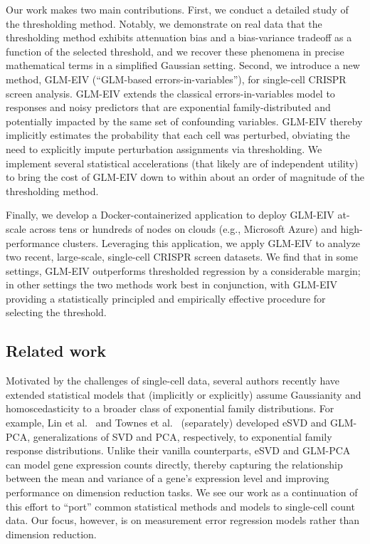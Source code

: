 \documentclass[12pt]{article}
\begin{document}
Our work makes two main contributions. First, we conduct a detailed study of the thresholding method. Notably, we demonstrate on real data that the thresholding method exhibits attenuation bias and a bias-variance tradeoff as a function of the selected threshold, and we recover these phenomena in precise mathematical terms in a simplified Gaussian setting. Second, we introduce a new method, GLM-EIV (``GLM-based errors-in-variables''), for single-cell CRISPR screen analysis. GLM-EIV extends the classical errors-in-variables model \parencite{carroll} to responses and noisy predictors that are exponential family-distributed and potentially impacted by the same set of confounding variables. GLM-EIV thereby implicitly estimates the probability that each cell was perturbed, obviating the need to explicitly impute perturbation assignments via thresholding. We implement several statistical accelerations (that likely are of independent utility) to bring the cost of GLM-EIV down to within about an order of magnitude of the thresholding method.

Finally, we develop a Docker-containerized application to deploy GLM-EIV at-scale across tens or hundreds of nodes on clouds (e.g., Microsoft Azure) and high-performance clusters. Leveraging this application, we apply GLM-EIV to analyze two recent, large-scale, single-cell CRISPR screen datasets. We find that in some settings, GLM-EIV outperforms thresholded regression by a considerable margin; in other settings the two methods work best in conjunction, with GLM-EIV providing a statistically principled and empirically effective procedure for selecting the threshold.

\iffalse
\subsection{Related work}
Motivated by the challenges of single-cell data, several authors recently have extended statistical models that (implicitly or explicitly) assume Gaussianity and homoscedasticity to a broader class of exponential family distributions. For example, Lin et al.\ \parencite{Lin2021} and Townes et al.\ \parencite{Townes2019}  (separately) developed eSVD and GLM-PCA, generalizations of SVD and PCA, respectively, to exponential family response distributions. Unlike their vanilla counterparts, eSVD and GLM-PCA can model gene expression counts directly, thereby capturing the relationship between the mean and variance of a gene's expression level \parencite{Lause2021} and improving performance on dimension reduction tasks. We see our work as a continuation of this effort to ``port'' common statistical methods and models to single-cell count data. Our focus, however, is on measurement error regression models rather than dimension reduction.
\end{document}
